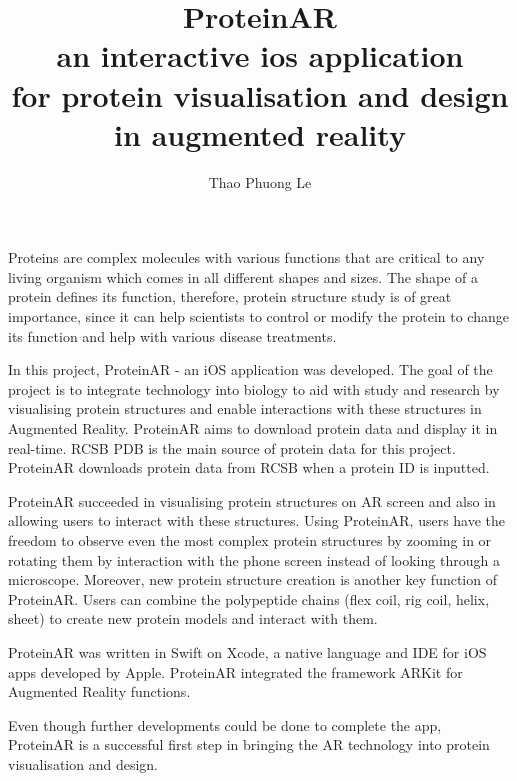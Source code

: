 \documentclass[MSCIM]{mscim}
\begin{document}

\title{\textbf{ProteinAR} \\an interactive ios application\\for protein visualisation and design in augmented reality}

\author{Thao Phuong Le}

\beforeabstract

Proteins are complex molecules with various functions that are critical to any living organism which comes in all different shapes and sizes. The shape of a protein defines its function, therefore, protein structure study is of great importance, since it can help scientists to control or modify the protein to change its function and help with various disease treatments. 

In this project, ProteinAR - an iOS application was developed. The goal of the project is to integrate technology into biology to aid with study and research by visualising protein structures and enable interactions with these structures in Augmented Reality. ProteinAR aims to download protein data and display it in real-time. RCSB PDB is the main source of protein data for this project. ProteinAR downloads protein data from RCSB when a protein ID is inputted. 

ProteinAR succeeded in visualising protein structures on AR screen and also in allowing users to interact with these structures. Using ProteinAR, users have the freedom to observe even the most complex protein structures by zooming in or rotating them by interaction with the phone screen instead of looking through a microscope. Moreover, new protein structure creation is another key function of ProteinAR. Users can combine the polypeptide chains (flex coil, rig coil, helix, sheet) to create new protein models and interact with them. 

ProteinAR was written in Swift on Xcode, a native language and IDE for iOS apps developed by Apple. ProteinAR integrated the framework ARKit for Augmented Reality functions. 

Even though further developments could be done to complete the app, ProteinAR is a successful first step in bringing the AR technology into protein visualisation and design.

\afterabstract



 
 
\afterpreface













\printbibliography
\end{document}
